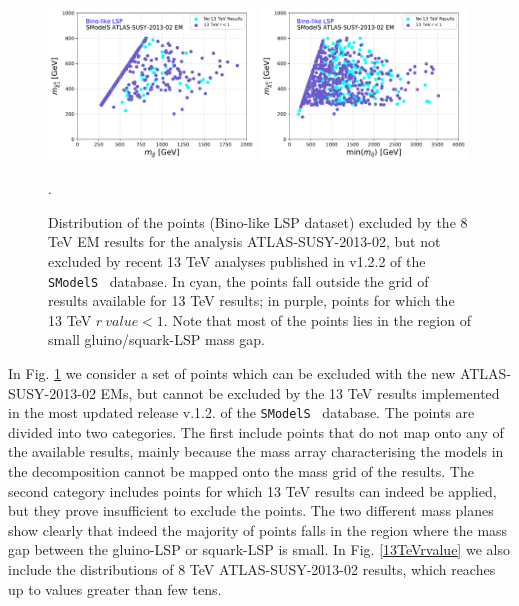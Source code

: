\documentclass[a4paper,11pt]{article}
\newcommand{\SMO}{\texttt{SModelS\xspace}}
\begin{document}
%
\begin{figure}
	\begin{center}
		\subfigure
		{\includegraphics[width=0.49\textwidth]{PLOTS/13TeV/13TeV_Glu_Neu.pdf}}
		\subfigure
		{\includegraphics[width=0.49\textwidth]{PLOTS/13TeV/13TeV_Sq_Neu.pdf}}
	\end{center}
	\caption{Distribution of the points (Bino-like LSP dataset) excluded by the 8 TeV EM results for the analysis ATLAS-SUSY-2013-02, but not excluded by recent 13 TeV analyses published in v1.2.2 of the \SMO~ database. In cyan, the points fall outside the grid of results available for 13 TeV results; in purple, points for which the 13 TeV $r \ value <1$. Note that most of the points lies in the region of small gluino/squark-LSP mass gap.}. 
	\label{13TEV}
\end{figure}
%
%
In Fig. \ref{13TEV} we consider a set of points which can be excluded with the new ATLAS-SUSY-2013-02 EMs, but cannot be excluded by the 13 TeV results implemented in the most updated release v.1.2. of the \SMO~ database. The points are divided into two categories. The first include points that do not map onto any of the available results, mainly because the mass array characterising the models in the decomposition cannot be mapped onto the mass grid of the results. The second category includes points for which 13 TeV results can indeed be applied, but they prove insufficient to exclude the points. 
The two different mass planes show clearly that indeed the majority of points falls in the region where the mass gap between the gluino-LSP or squark-LSP is small. In Fig. \ref{13TeVrvalue} we also include the distributions of 8 TeV ATLAS-SUSY-2013-02 results, which reaches up to values greater than few tens.
\end{document}

